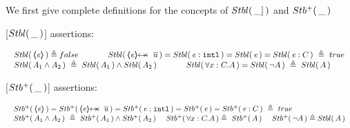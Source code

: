 We first give complete definitions for the concepts of $  {Stbl(\, \_]\, )}$ and ${Stb^+(\, \_\, )}$

\vspace{.2cm}

\begin{definition}
\label{def:Basic}
[${Stbl(\, \_\, )}$] assertions: %

$
\begin{array}{l}
 \begin{array}{lll}
  \Stable {\inside{\re}}  \triangleq  false & \lclSPACE &   \Stable {\protectedFrom \re {\overline {u}}} =  
  \Stable  {\internal \re} =  %
    \Stable {\re}=   
     \Stable {\re:C}\   \triangleq \    true
 \end{array}
  \\
 \begin{array}{lcl}
 \Stable  {A_1  \wedge  A_2}\  \triangleq\     \Stable  { A_1}  \wedge    \Stable  {A_2}    &
\lclSPACE  &  
 \Stable  {\forall x:C.A} =\Stable  {\neg A} \   \triangleq\   \Stable A
 \end{array}
 \end{array}
$
\label{f:Basic}
 \end{definition}


 \begin{definition}
[${Stb^+(\, \_\, )}$] assertions: %

$
\begin{array}{l}
 \begin{array}{l}
  \Pos {\inside{\re}} =  \Pos {\protectedFrom \re {\overline {u}}} =  
  \Pos  {\internal \re} =   
    \Pos {\re}=   
     \Pos {\re:C}\   \triangleq \    true
 \end{array}
  \\
 \begin{array}{lll}
 \Pos  {A_1  \wedge  A_2}\  \triangleq\     \Pos  { A_1}  \wedge    \Pos  {A_2}   \  &    
 \Pos  {\forall x:C.A}   \triangleq\   \Pos A
\   &
  \Pos {\neg A}  \triangleq \Stable A %
 \end{array}
 \end{array}
 $
 \label{def:Pos}
\end{definition}


